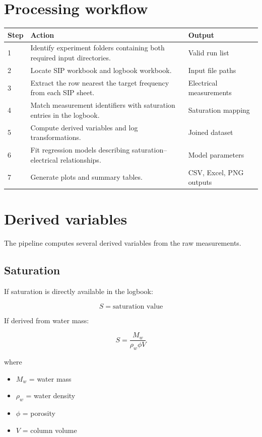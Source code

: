 \documentclass[11pt]{article}
\begin{document}
\section{Processing workflow}

\begin{longtable}{p{} p{} p{}}
\toprule
\textbf{Step} & \textbf{Action} & \textbf{Output}\\
\midrule
\endhead
1 & Identify experiment folders containing both required input directories. & Valid run list\\
2 & Locate SIP workbook and logbook workbook. & Input file paths\\
3 & Extract the row nearest the target frequency from each SIP sheet. & Electrical measurements\\
4 & Match measurement identifiers with saturation entries in the logbook. & Saturation mapping\\
5 & Compute derived variables and log transformations. & Joined dataset\\
6 & Fit regression models describing saturation–electrical relationships. & Model parameters\\
7 & Generate plots and summary tables. & CSV, Excel, PNG outputs\\
\bottomrule
\end{longtable}

\section{Derived variables}

The pipeline computes several derived variables from the raw measurements.

\subsection{Saturation}

If saturation is directly available in the logbook:

\[
S = \text{saturation value}
\]

If derived from water mass:

\[
S = \frac{M_w}{\rho_w \phi V}
\]

where

\begin{itemize}
\item $M_w$ = water mass
\item $\rho_w$ = water density
\item $\phi$ = porosity
\item $V$ = column volume
\end{itemize}
\end{document}

